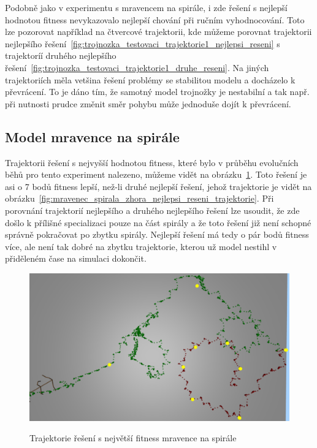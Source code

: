 Podobně jako v experimentu s mravencem na spirále, i zde řešení s nejlepší hodnotou fitness nevykazovalo nejlepší chování při ručním vyhodnocování.
Toto lze pozorovat například na čtvercové trajektorii, kde můžeme porovnat trajektorii nejlepšího řešení~\ref{fig:trojnozka_testovaci_trajektorie1_nejlepsi_reseni} s trajektoríí druhého nejlepšího řešení~\ref{fig:trojnozka_testovaci_trajektorie1_druhe_reseni}.
Na jiných trajektoriích měla vetšina řešení problémy se stabilitou modelu a docházelo k převrácení.
To je dáno tím, že samotný model trojnožky je nestabilní a tak např. při nutnosti prudce změnit směr pohybu může jednoduše dojít k převrácení.

\clearpage


\subsection{Model mravence na spirále}
\label{subsec:mravenec_spirala}

Trajektorii řešení s nejvyšší hodnotou fitness, které bylo v průběhu evolučních běhů pro tento experiment nalezeno, můžeme vidět na obrázku~\ref{fig:mravenec_spirala_zhora_nejlepsi_reseni_neoptimalni_trajektorie}.
Toto řešení je asi o 7 bodů fitness lepší, než-li druhé nejlepší řešení, jehož trajektorie je vidět na obrázku~\ref{fig:mravenec_spirala_zhora_nejlepsi_reseni_trajektorie}.
Při porovnání trajektorií nejlepšího a druhého nejlepšího řešení lze usoudit, že zde došlo k přílišné specializaci pouze na část spirály a že toto řešení již není schopné správně pokračovat po zbytku spirály.
Nejlepší řešení má tedy o pár bodů fitness více, ale není tak dobré na zbytku trajektorie, kterou už model nestihl v přiděleném čase na simulaci dokončit.

\begin{figure}[h]
    \centering
    {\includegraphics[width=\linewidth]{obrazky/mravenec_spirala_zhora_nejlepsi_reseni_neoptimalni_trajektorie.png}}
    \caption{
    Trajektorie řešení s největší fitness mravence na spirále
    }
    \label{fig:mravenec_spirala_zhora_nejlepsi_reseni_neoptimalni_trajektorie}
\end{figure}

